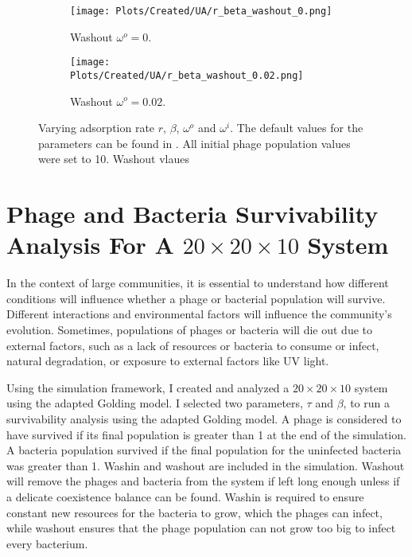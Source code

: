 \begin{figure}[]
    \centering
    \begin{subfigure}{0.49\linewidth}
        \centering
        \texttt{[image: Plots/Created/UA/r\_beta\_washout\_0.png]}
        \caption{
            Washout $\omega^o=0$. 
        }
        \label{fig:created:r_beta_washout_0}
    \end{subfigure}
    \hfill
    \begin{subfigure}{0.49\linewidth}
        \centering
        \texttt{[image: Plots/Created/UA/r\_beta\_washout\_0.02.png]}
        \caption{
            Washout $\omega^o=0.02$. 
        }
        \label{fig:created:r_beta_washout_0.02}
    \end{subfigure}
    \caption{
        Varying adsorption rate $r$, $\beta$, $\omega^o$ and $\omega^i$. 
        The default values for the parameters can be found in . 
        All initial phage population values were set to 10. 
        Washout vlaues
    }
\end{figure}

\section{Phage and Bacteria Survivability Analysis For A $20\times20\times10$ System}
In the context of large communities, it is essential to understand how different conditions will influence whether a phage or bacterial population will survive. 
Different interactions and environmental factors will influence the community's evolution. 
Sometimes, populations of phages or bacteria will die out due to external factors, such as a lack of resources or bacteria to consume or infect, natural degradation, or exposure to external factors like UV light. 

Using the simulation framework, I created and analyzed a $20\times20\times10$ system using the adapted Golding model. 
I selected two parameters, $\tau$ and $\beta$, to run a survivability analysis using the adapted Golding model. 
A phage is considered to have survived if its final population is greater than 1 at the end of the simulation. 
A bacteria population survived if the final population for the uninfected bacteria was greater than 1. 
Washin and washout are included in the simulation. 
Washout will remove the phages and bacteria from the system if left long enough unless if a delicate coexistence balance can be found. 
Washin is required to ensure constant new resources for the bacteria to grow, which the phages can infect, while washout ensures that the phage population can not grow too big to infect every bacterium. 

